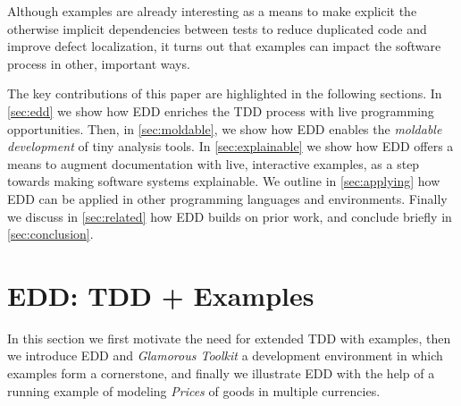 \documentclass[acmsmall,screen,authorversion,nonacm]{acmart} %
\begin{document}
Although examples are already interesting as a means to make explicit the otherwise implicit dependencies between tests to reduce duplicated code and improve defect localization, it turns out that examples can impact the software process in other, important ways.

The key contributions of this paper are highlighted in the following sections.
In \autoref{sec:edd} we show how EDD enriches the TDD process with live programming opportunities.
Then, in \autoref{sec:moldable}, we show how EDD enables the \emph{moldable development} of tiny analysis tools.
In \autoref{sec:explainable} we show how EDD offers a means to augment documentation with live, interactive examples, as a step towards making software systems explainable.
We outline in \autoref{sec:applying} how EDD can be applied in other programming languages and environments.
Finally we discuss in \autoref{sec:related} how EDD builds on prior work, and conclude briefly in \autoref{sec:conclusion}.

%
%

\section{EDD: TDD + Examples}\label{sec:edd}

In this section we first motivate the need for extended TDD with examples, then we introduce EDD and \emph{Glamorous Toolkit} a development environment in which examples form a cornerstone, and finally we illustrate EDD with the help of a running example of modeling \emph{Prices} of goods in multiple currencies.
\end{document}
